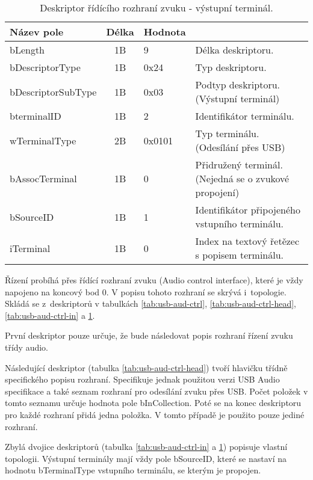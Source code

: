 \begin{table}[t]
\begin{center}
\begin{tabular}{|l|c|l|l|}
\hline 
Název pole & Délka & Hodnota &  \\ 
\hline
bLength & 1B & 9 & Délka deskriptoru.\\
\hline
bDescriptorType & 1B & 0x24 & Typ deskriptoru. \\
\hline
bDescriptorSubType & 1B & 0x03 & Podtyp deskriptoru. (Výstupní terminál)\\
\hline
bterminalID & 1B & 2 & Identifikátor terminálu.\\
\hline
wTerminalType & 2B & 0x0101 & Typ terminálu. (Odesílání přes USB)\\
\hline
bAssocTerminal & 1B & 0 & Přidružený terminál. (Nejedná se o zvukové propojení)\\
\hline
bSourceID & 1B & 1 & Identifikátor připojeného vstupního terminálu. \\
\hline
iTerminal & 1B & 0 & Index na textový řetězec s popisem terminálu.\\
\hline
\end{tabular}  

\end{center}
\caption{Deskriptor řídícího rozhraní zvuku - výstupní terminál.}
\label{tab:usb-aud-ctrl-out} 
\end{table}
\FloatBarrier

Řízení probíhá přes řídící rozhraní zvuku (Audio control interface), které je vždy napojeno na koncový bod 0.  V popisu tohoto rozhraní se skrývá i~topologie. Skládá se z~deskriptorů v tabulkách \ref{tab:usb-aud-ctrl}, \ref{tab:usb-aud-ctrl-head}, \ref{tab:usb-aud-ctrl-in} a \ref{tab:usb-aud-ctrl-out}.

První deskriptor pouze určuje, že bude následovat popis rozhraní řízení zvuku třídy audio.

Následující deskriptor  (tabulka \ref{tab:usb-aud-ctrl-head}) tvoří hlavičku třídně specifického popisu rozhraní. Specifikuje jednak použitou verzi USB Audio specifikace a také seznam rozhraní pro odesílání zvuku přes USB. Počet položek v tomto seznamu určuje hodnota pole bInCollection. Poté se na konec deskriptoru pro každé rozhraní přidá jedna položka. V tomto případě je použito pouze jediné rozhraní.

Zbylá dvojice deskriptorů (tabulka \ref{tab:usb-aud-ctrl-in} a \ref{tab:usb-aud-ctrl-out}) popisuje vlastní topologii. Výstupní terminály mají vždy pole bSourceID, které se nastaví na hodnotu bTerminalType vstupního terminálu, se kterým je propojen.

